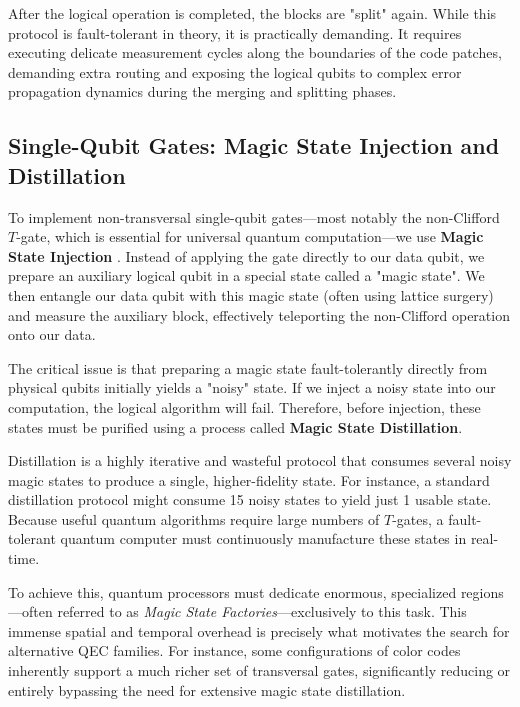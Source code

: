After the logical operation is completed, the blocks are "split" again. While this protocol is fault-tolerant in theory, it is practically demanding. It requires executing delicate measurement cycles along the boundaries of the code patches, demanding extra routing and exposing the logical qubits to complex error propagation dynamics during the merging and splitting phases.

\subsection*{Single-Qubit Gates: Magic State Injection and Distillation}
To implement non-transversal single-qubit gates---most notably the non-Clifford $T$-gate, which is essential for universal quantum computation---we use \textbf{Magic State Injection} \cite{bravyi2005universal}. Instead of applying the gate directly to our data qubit, we prepare an auxiliary logical qubit in a special state called a "magic state". We then entangle our data qubit with this magic state (often using lattice surgery) and measure the auxiliary block, effectively teleporting the non-Clifford operation onto our data.

The critical issue is that preparing a magic state fault-tolerantly directly from physical qubits initially yields a "noisy" state. If we inject a noisy state into our computation, the logical algorithm will fail. Therefore, before injection, these states must be purified using a process called \textbf{Magic State Distillation}. 

Distillation is a highly iterative and wasteful protocol that consumes several noisy magic states to produce a single, higher-fidelity state. For instance, a standard distillation protocol might consume 15 noisy states to yield just 1 usable state. Because useful quantum algorithms require large numbers of $T$-gates, a fault-tolerant quantum computer must continuously manufacture these states in real-time. 

 To achieve this, quantum processors must dedicate enormous, specialized regions---often referred to as \textit{Magic State Factories}---exclusively to this task. This immense spatial and temporal overhead is precisely what motivates the search for alternative QEC families. For instance, some configurations of color codes \cite{bombin_martindelgado_2006} inherently support a much richer set of transversal gates, significantly reducing or entirely bypassing the need for extensive magic state distillation.









